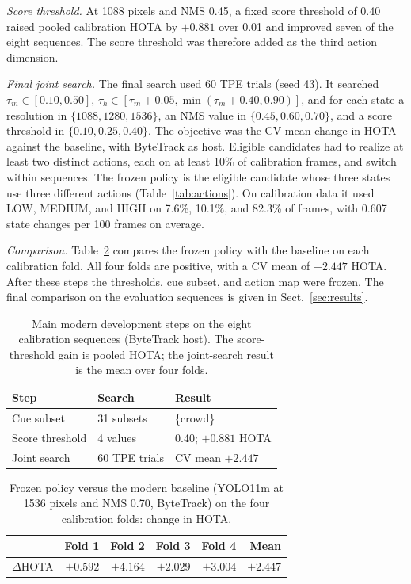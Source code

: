 \emph{Score threshold.} At 1088 pixels and NMS 0.45, a fixed score threshold
of 0.40 raised pooled calibration HOTA by $+0.881$ over 0.01 and improved
seven of the eight sequences. The score threshold was therefore added as the
third action dimension.

\emph{Final joint search.} The final search used 60 TPE trials (seed 43). It
searched $\tau_m\in[0.10,0.50]$, $\tau_h\in[\tau_m+0.05,\min(\tau_m+0.40,0.90)]$,
and for each state a resolution in $\{1088,1280,1536\}$, an NMS value in
$\{0.45,0.60,0.70\}$, and a score threshold in $\{0.10,0.25,0.40\}$. The
objective was the CV mean change in HOTA against the baseline, with ByteTrack
as host. Eligible candidates had to realize at least two distinct actions,
each on at least 10\% of calibration frames, and switch within sequences. The
frozen policy is the eligible candidate whose three states use three
different actions (Table~\ref{tab:actions}). On calibration data it used LOW,
MEDIUM, and HIGH on 7.6\%, 10.1\%, and 82.3\% of frames, with 0.607 state
changes per 100 frames on average.

\emph{Comparison.} Table~\ref{tab:folds} compares the frozen policy with the
baseline on each calibration fold. All four folds are positive, with a CV
mean of $+2.447$ HOTA. After these steps the thresholds, cue subset, and
action map were frozen. The final comparison on the evaluation sequences is
given in Sect.~\ref{sec:results}.

\begin{table}[t]
\caption{Main modern development steps on the eight calibration sequences
(ByteTrack host). The score-threshold gain is pooled HOTA; the joint-search
result is the mean over four folds.}
\label{tab:devrecord}
\centering\footnotesize
\setlength{\tabcolsep}{3pt}
\begin{tabular}{@{}lll@{}}
\toprule
Step & Search & Result\\
\midrule
Cue subset & 31 subsets & \{crowd\}\\
Score threshold & 4 values & 0.40; $+0.881$ HOTA\\
Joint search & 60 TPE trials & CV mean $+2.447$\\
\bottomrule
\end{tabular}
\end{table}

\begin{table}[t]
\caption{Frozen policy versus the modern baseline (YOLO11m at 1536 pixels and
NMS 0.70, ByteTrack) on the four calibration folds: change in HOTA.}
\label{tab:folds}
\centering\footnotesize
\begin{tabular}{@{}lrrrrr@{}}
\toprule
 & Fold 1 & Fold 2 & Fold 3 & Fold 4 & Mean\\
\midrule
$\Delta$HOTA & $+0.592$ & $+4.164$ & $+2.029$ & $+3.004$ & $+2.447$\\
\bottomrule
\end{tabular}
\end{table}
